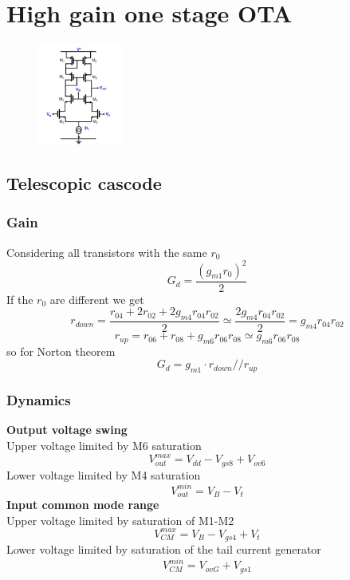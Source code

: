 \chapter{High gain one stage OTA}

\begin{figure}
\includegraphics[width=0.25\textwidth]{telescopiccascode.png}
\end{figure}

\section{Telescopic cascode}
\subsection{Gain}
Considering all transistors with the same $r_0$
\begin{equation}
G_d=\frac{(g_{m1}r_0)^2}{2}
\end{equation}
If the $r_0$ are different we get
\begin{equation}
r_{down}=\frac{r_{04}+2r_{02}+2g_{m4}r_{04}r_{02}}{2}\simeq \frac{2g_{m4}r_{04}r_{02}}{2}=g_{m4}r_{04}r_{02}
\end{equation}
\begin{equation}
r_{up}=r_{06}+r_{08}+g_{m6}r_{06}r_{08}\simeq g_{m6}r_{06}r_{08}
\end{equation}
so for Norton theorem
\begin{equation}
G_d=g_{m1}\cdot r_{down}//r_{up}
\end{equation}


\subsection{Dynamics}

{\bf Output voltage swing}\\
Upper voltage limited by M6 saturation 
\begin{equation}
V_{out}^{max}=V_{dd}-V_{gs8}+V_{ov6}
\end{equation}
Lower voltage limited by M4 saturation
\begin{equation}
V_{out}^{min}=V_B-V_t
\end{equation}
{\bf Input common mode range}\\
Upper voltage limited by saturation of M1-M2
\begin{equation}
V_{CM}^{max}=V_B-V_{gs4}+V_t
\end{equation}
Lower voltage limited by saturation of the tail current generator
\begin{equation}
V_{CM}^{min}=V_{ovG}+V_{gs1}
\end{equation}

